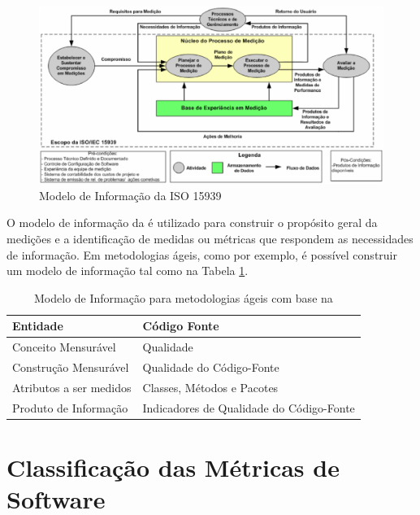 \begin{figure}[h!]
\centering
	\includegraphics[keepaspectratio=true,scale=0.3]{figuras/processo15939.eps}
	\caption{Modelo de Informação da ISO 15939}
	\label{informação}
\end{figure}
\FloatBarrier

O modelo de informação da  é utilizado para construir o 
propósito geral da medições e a identificação de medidas ou métricas que 
respondem as necessidades de informação. Em metodologias ágeis, como por exemplo, é possível construir um modelo de informação tal como na 
Tabela \ref{construção-ágil}.

	\begin{table}[!ht]
	\begin{center}
	 \begin{tabular}{|l|l|}
		\hline
		Entidade  & Código Fonte 
		\\ \hline
		Conceito Mensurável       & Qualidade      
		\\ \hline
		Construção Mensurável       & Qualidade do Código-Fonte      
		\\ \hline
		Atributos a ser medidos & Classes, Métodos e Pacotes   
		\\ \hline
		Produto de Informação   & Indicadores de Qualidade do Código-Fonte      
		\\ \hline
		\end{tabular}
		\caption{Modelo de Informação para metodologias ágeis com base na 
		}
		\label{construção-ágil}
		\end{center}
		\end{table}		


\section{Classificação das Métricas de Software}	
\label{Classificação das Métricas de Software}

